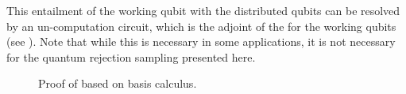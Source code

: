 This entailment of the working qubit with the distributed qubits can be resolved by an un-computation circuit, which is the adjoint of the \computationCircuit{} for the working qubits (see ).
Note that while this is necessary in some applications, it is not necessary for the quantum rejection sampling presented here.

%        

\begin{figure}
    \begin{center}
        
    \end{center}
    \caption{
        Proof of  based on basis calculus.
    }\label{fig:proofDecomposition}
\end{figure}



